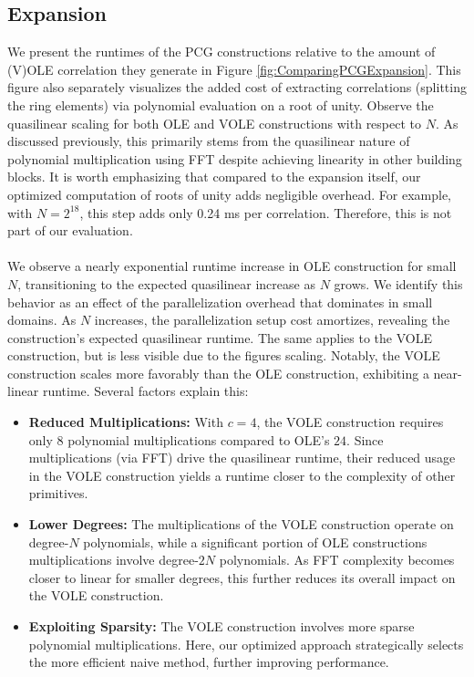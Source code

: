 \subsection{Expansion}
\label{subsec:evalExpansionVOLE}
We present the runtimes of the PCG constructions relative to the amount of (V)OLE correlation they generate in Figure \ref{fig:ComparingPCGExpansion}. This figure also separately visualizes the added cost of extracting correlations (splitting the ring elements) via polynomial evaluation on a root of unity. Observe the quasilinear scaling for both OLE and VOLE constructions with respect to $N$. As discussed previously, this primarily stems from the quasilinear nature of polynomial multiplication using FFT despite achieving linearity in other building blocks. It is worth emphasizing that compared to the expansion itself, our optimized computation of roots of unity adds negligible overhead. For example, with $N=2^{18}$, this step adds only 0.24 ms per correlation. Therefore, this is not part of our evaluation.
\\\\
We observe a nearly exponential runtime increase in OLE construction for small $N$, transitioning to the expected quasilinear increase as $N$ grows. We identify this behavior as an effect of the parallelization overhead that dominates in small domains. As $N$ increases, the parallelization setup cost amortizes, revealing the construction's expected quasilinear runtime. The same applies to the VOLE construction, but is less visible due to the figures scaling. Notably, the VOLE construction scales more favorably than the OLE construction, exhibiting a near-linear runtime. Several factors explain this:

\begin{itemize}
    \item \textbf{Reduced Multiplications:} With $c=4$, the VOLE construction requires only $8$ polynomial multiplications compared to OLE's $24$. Since multiplications (via FFT) drive the quasilinear runtime, their reduced usage in the VOLE construction yields a runtime closer to the complexity of other primitives.
    
    \item \textbf{Lower Degrees:} The multiplications of the VOLE construction operate on degree-$N$ polynomials, while a significant portion of OLE constructions multiplications involve degree-$2N$ polynomials. As FFT complexity becomes closer to linear for smaller degrees, this further reduces its overall impact on the VOLE construction.
    
    \item \textbf{Exploiting Sparsity:} The VOLE construction involves more sparse polynomial multiplications. Here, our optimized approach strategically selects the more efficient naive method, further improving performance.
\end{itemize}


